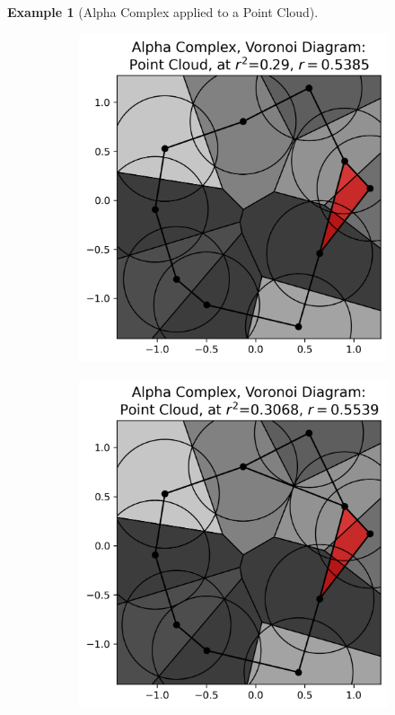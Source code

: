 \documentclass[ma]{uncgdissertationexp}
\theoremstyle{plain}
\theoremstyle{definition}
\newtheorem{example}[theorem]{Example}
\theoremstyle{remark}
\begin{document}
\begin{example}[Alpha Complex applied to a Point Cloud]
\begin{figure}[H]
\begin{subfigure}[b]{0.27\textwidth}
    \end{subfigure}
    \begin{subfigure}[b]{0.27\textwidth}
        \includegraphics[width=\textwidth]{point_cloud_plot_alpha_3.png}
    \end{subfigure}
    \begin{subfigure}[b]{0.27\textwidth}
        \includegraphics[width=\textwidth]{point_cloud_plot_alpha_4.png}

\end{subfigure}
\end{figure}
\end{example}
\end{document}
